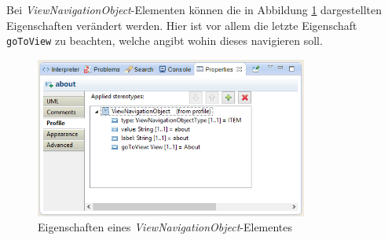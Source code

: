 Bei \textit{ViewNavigationObject}-Elementen können die in Abbildung
\ref{Fig:ViewNavProp} dargestellten Eigenschaften verändert werden. Hier ist
vor allem die letzte Eigenschaft \texttt{goToView} zu beachten, welche angibt
wohin dieses navigieren soll.

\begin{figure}[htbp]
\begin{center}
\includegraphics[width=0.8\textwidth]{./img/Prop-ViewNavigationObjects.png}
\caption{Eigenschaften eines \textit{ViewNavigationObject}-Elementes
}\label{Fig:ViewNavProp}
\end{center}
\end{figure}
